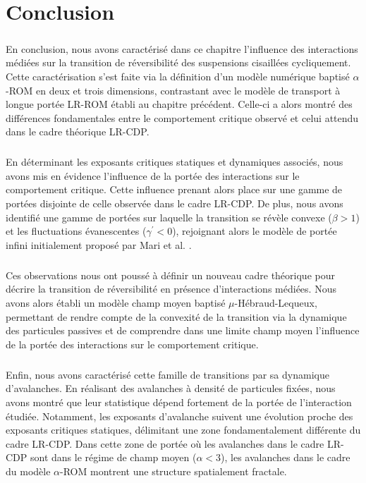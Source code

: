 \section{Conclusion}

\subparagraph{}En conclusion, nous avons caractérisé dans ce chapitre l'influence des interactions médiées sur la transition de réversibilité des suspensions cisaillées cycliquement. Cette caractérisation s'est faite via la définition d'un modèle numérique baptisé $\alpha$-ROM en deux et trois dimensions, contrastant avec le modèle de transport à longue portée LR-ROM établi au chapitre précédent. Celle-ci a alors montré des différences fondamentales entre le comportement critique observé et celui attendu dans le cadre théorique LR-CDP.

\subparagraph{}En déterminant les exposants critiques statiques et dynamiques associés, nous avons mis en évidence l'influence de la portée des interactions sur le comportement critique. Cette influence prenant alors place sur une gamme de portées disjointe de celle observée dans le cadre LR-CDP. De plus, nous avons identifié une gamme de portées sur laquelle la transition se révèle convexe ($\beta >1$) et les fluctuations évanescentes ($\gamma^\prime < 0$), rejoignant alors le modèle de portée infini initialement proposé par Mari et al. \cite{mari_absorbing_2022}.

\subparagraph{}Ces observations nous ont poussé à définir un nouveau cadre théorique pour décrire la transition de réversibilité en présence d'interactions médiées. Nous avons alors établi un modèle champ moyen baptisé $\mu$-Hébraud-Lequeux, permettant de rendre compte de la convexité de la transition via la dynamique des particules passives et de comprendre dans une limite champ moyen l'influence de la portée des interactions sur le comportement critique.

\subparagraph{}Enfin, nous avons caractérisé cette famille de transitions par sa dynamique d'avalanches. En réalisant des avalanches à densité de particules fixées, nous avons montré que leur statistique dépend fortement de la portée de l'interaction étudiée. Notamment, les exposants d'avalanche suivent une évolution proche des exposants critiques statiques, délimitant une zone fondamentalement différente du cadre LR-CDP. Dans cette zone de portée où les avalanches dans le cadre LR-CDP sont dans le régime de champ moyen ($\alpha < 3$), les avalanches dans le cadre du modèle $\alpha$-ROM montrent une structure spatialement fractale.
